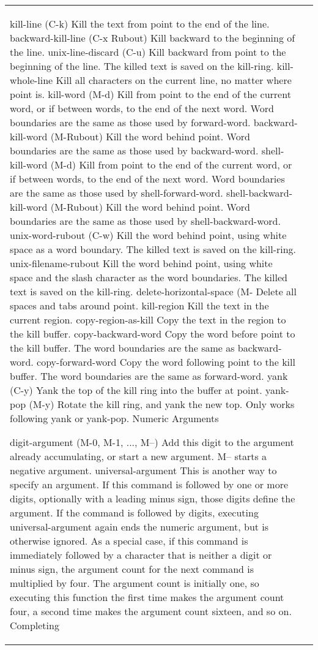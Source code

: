 \documentclass[11pt]{article}
\begin{document}
\begin{longtable}{p{}p{}}
{{{kill-line (C-k)
Kill the text from point to the end of the line.
backward-kill-line (C-x Rubout)
Kill backward to the beginning of the line.
unix-line-discard (C-u)
Kill backward from point to the beginning of the line. The killed text is saved on the kill-ring.
kill-whole-line
Kill all characters on the current line, no matter where point is.
kill-word (M-d)
Kill from point to the end of the current word, or if between words, to the end of the next word. Word boundaries are the same as those used by forward-word.
backward-kill-word (M-Rubout)
Kill the word behind point. Word boundaries are the same as those used by backward-word.
shell-kill-word (M-d)
Kill from point to the end of the current word, or if between words, to the end of the next word. Word boundaries are the same as those used by shell-forward-word.
shell-backward-kill-word (M-Rubout)
Kill the word behind point. Word boundaries are the same as those used by shell-backward-word.
unix-word-rubout (C-w)
Kill the word behind point, using white space as a word boundary. The killed text is saved on the kill-ring.
unix-filename-rubout
Kill the word behind point, using white space and the slash character as the word boundaries. The killed text is saved on the kill-ring.
delete-horizontal-space (M-\)
Delete all spaces and tabs around point.
kill-region
Kill the text in the current region.
copy-region-as-kill
Copy the text in the region to the kill buffer.
copy-backward-word
Copy the word before point to the kill buffer. The word boundaries are the same as backward-word.
copy-forward-word
Copy the word following point to the kill buffer. The word boundaries are the same as forward-word.
yank (C-y)
Yank the top of the kill ring into the buffer at point.
yank-pop (M-y)
Rotate the kill ring, and yank the new top. Only works following yank or yank-pop.
Numeric Arguments

digit-argument (M-0, M-1, ..., M--)
Add this digit to the argument already accumulating, or start a new argument. M-- starts a negative argument.
universal-argument
This is another way to specify an argument. If this command is followed by one or more digits, optionally with a leading minus sign, those digits define the argument. If the command is followed by digits, executing universal-argument again ends the numeric argument, but is otherwise ignored. As a special case, if this command is immediately followed by a character that is neither a digit or minus sign, the argument count for the next command is multiplied by four. The argument count is initially one, so executing this function the first time makes the argument count four, a second time makes the argument count sixteen, and so on.
Completing

}}}
\end{longtable}
\end{document}
